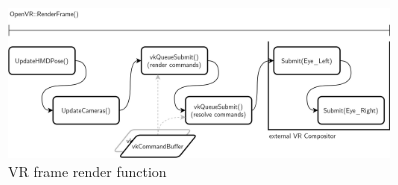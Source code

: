 \begin{figure}[htb]
  \centering
  \includegraphics[width=0.9\textwidth]{pictures/Tachyon_OpenVR_RenderFrame}
  \caption[VR render target's RenderFrame]{VR frame render function}\label{fig:lst_OpenVR_RenderFrame}
\end{figure} 


